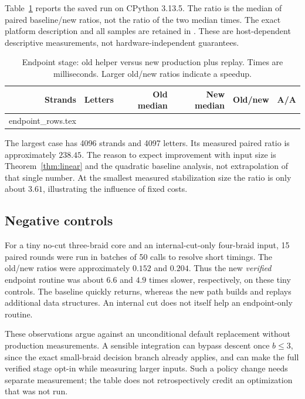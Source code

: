 \documentclass[11pt,letterpaper]{article}
\makeatletter
\theoremstyle{definition}
\let\tableinput\@@input
\makeatother
\begin{document}
Table~\ref{tab:endpoint} reports the saved run on CPython 3.13.5. The ratio is the median of paired baseline/new ratios, not the ratio of the two median times. The exact platform description and all samples are retained in . These are host-dependent descriptive measurements, not hardware-independent guarantees.

\begin{table}[htbp]
\centering
\caption{Endpoint stage: old helper versus new production plus replay. Times are milliseconds. Larger old/new ratios indicate a speedup.}
\label{tab:endpoint}
\small
\begin{tabular}{rrrrrr}
\toprule
Strands & Letters & Old median & New median & Old/new & A/A \\
\midrule
\tableinput endpoint_rows.tex 
\bottomrule
\end{tabular}
\end{table}

The largest case has 4096 strands and 4097 letters. Its measured paired ratio is approximately $238.45$. The reason to expect improvement with input size is Theorem~\ref{thm:linear} and the quadratic baseline analysis, not extrapolation of that single number. At the smallest measured stabilization size the ratio is only about $3.61$, illustrating the influence of fixed costs.

\subsection{Negative controls}
For a tiny no-cut three-braid core and an internal-cut-only four-braid input, 15 paired rounds were run in batches of 50 calls to resolve short timings. The old/new ratios were approximately $0.152$ and $0.204$. Thus the new \emph{verified} endpoint routine was about $6.6$ and $4.9$ times slower, respectively, on these tiny controls. The baseline quickly returns, whereas the new path builds and replays additional data structures. An internal cut does not itself help an endpoint-only routine.

These observations argue against an unconditional default replacement without production measurements. A sensible integration can bypass descent once $b\le3$, since the exact small-braid decision branch already applies, and can make the full verified stage opt-in while measuring larger inputs. Such a policy change needs separate measurement; the table does not retrospectively credit an optimization that was not run.
\end{document}
